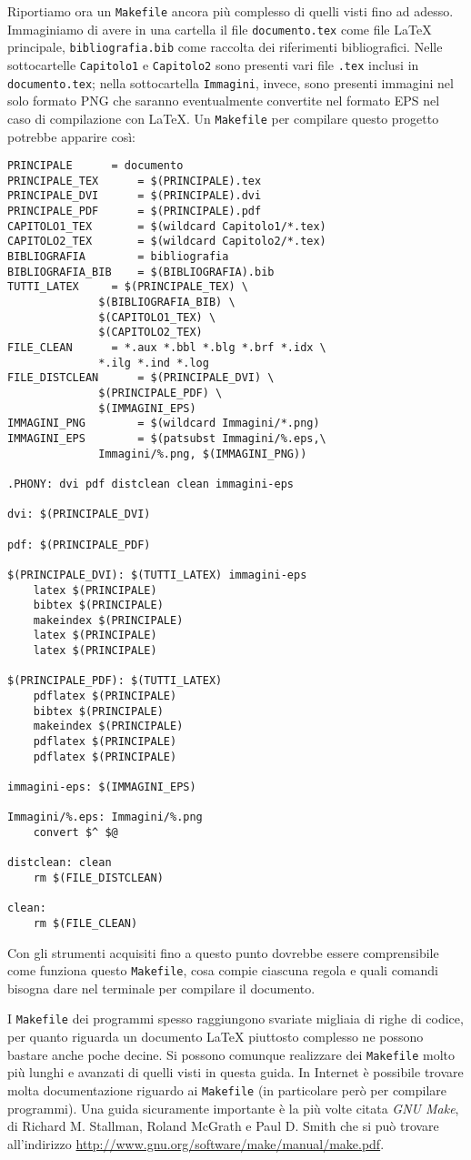 Riportiamo ora un \verb|Makefile| ancora più complesso di quelli visti fino ad
adesso. Immaginiamo di avere in una cartella il file \verb|documento.tex| come
file \LaTeX{}
principale, \verb|bibliografia.bib| come raccolta dei riferimenti bibliografici.
Nelle sottocartelle \verb|Capitolo1| e \verb|Capitolo2| sono presenti vari file
\verb|.tex| inclusi in \verb|documento.tex|; nella sottocartella
\verb|Immagini|, invece, sono presenti immagini nel solo formato \textsc{PNG}
che saranno eventualmente convertite nel formato \textsc{EPS} nel caso di
compilazione con \LaTeX.  Un \verb|Makefile| per compilare questo progetto
potrebbe apparire così:
\begin{lstlisting}
PRINCIPALE 		= documento
PRINCIPALE_TEX		= $(PRINCIPALE).tex
PRINCIPALE_DVI		= $(PRINCIPALE).dvi
PRINCIPALE_PDF		= $(PRINCIPALE).pdf
CAPITOLO1_TEX		= $(wildcard Capitolo1/*.tex)
CAPITOLO2_TEX		= $(wildcard Capitolo2/*.tex)
BIBLIOGRAFIA		= bibliografia
BIBLIOGRAFIA_BIB	= $(BIBLIOGRAFIA).bib
TUTTI_LATEX		= $(PRINCIPALE_TEX) \
			  $(BIBLIOGRAFIA_BIB) \
			  $(CAPITOLO1_TEX) \
			  $(CAPITOLO2_TEX)
FILE_CLEAN		= *.aux *.bbl *.blg *.brf *.idx \
			  *.ilg *.ind *.log
FILE_DISTCLEAN		= $(PRINCIPALE_DVI) \
			  $(PRINCIPALE_PDF) \
			  $(IMMAGINI_EPS)
IMMAGINI_PNG		= $(wildcard Immagini/*.png)
IMMAGINI_EPS		= $(patsubst Immagini/%.eps,\
			  Immagini/%.png, $(IMMAGINI_PNG))

.PHONY: dvi pdf distclean clean immagini-eps

dvi: $(PRINCIPALE_DVI)

pdf: $(PRINCIPALE_PDF)

$(PRINCIPALE_DVI): $(TUTTI_LATEX) immagini-eps
	latex $(PRINCIPALE)
	bibtex $(PRINCIPALE)
	makeindex $(PRINCIPALE)
	latex $(PRINCIPALE)
	latex $(PRINCIPALE)

$(PRINCIPALE_PDF): $(TUTTI_LATEX)
	pdflatex $(PRINCIPALE)
	bibtex $(PRINCIPALE)
	makeindex $(PRINCIPALE)
	pdflatex $(PRINCIPALE)
	pdflatex $(PRINCIPALE)

immagini-eps: $(IMMAGINI_EPS)

Immagini/%.eps: Immagini/%.png
	convert $^ $@

distclean: clean
	rm $(FILE_DISTCLEAN)

clean:
	rm $(FILE_CLEAN)
\end{lstlisting}
Con gli strumenti acquisiti fino a questo punto dovrebbe essere comprensibile
come funziona questo \verb|Makefile|, cosa compie ciascuna regola e quali
comandi bisogna dare nel terminale per compilare il documento.

I \verb|Makefile| dei programmi spesso raggiungono svariate migliaia di righe di
codice, per quanto riguarda un documento \LaTeX{}
piuttosto complesso ne possono bastare anche poche decine.  Si possono comunque
realizzare dei \verb|Makefile| molto più lunghi e avanzati di quelli visti in
questa guida.  In Internet è possibile trovare molta documentazione riguardo ai
\verb|Makefile| (in particolare però per compilare programmi).  Una guida
sicuramente importante è la più volte citata \emph{GNU Make}, di Richard
M. Stallman, Roland McGrath e Paul D. Smith che si può trovare all'indirizzo
\url{http://www.gnu.org/software/make/manual/make.pdf}.

